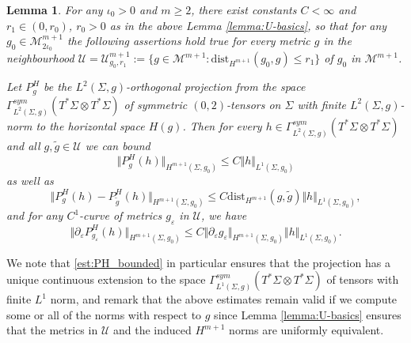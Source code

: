\documentclass[10pt,reqno]{amsart}
\theoremstyle{plain}
\newtheorem{lemma}{Lemma}[section]
\theoremstyle{definition}
\numberwithin{equation}{section}
\newcommand{\Si}{\Sigma}
\newcommand{\peps}{\partial_{\eps}}
\newcommand{\norm}[1]{\Vert#1\Vert}
\newcommand{\beq}{\begin{equation}}
\newcommand{\eeq}{\end{equation}}
\newcommand{\eps}{\varepsilon}
\newcommand{\dist}{\text{dist}}
\newcommand{\MM}{\mathcal{M}} %
\newcommand{\UU}{{\mathcal U}}
\newcommand{\MMtwoiota}{\MM_{2\iota_0}}
\begin{document}
\begin{lemma}\label{lemma:projection}
    For any $\iota_0>0$ and $m\geq 2$, there exist constants $C<\infty$ and $r_1\in (0,r_0)$, $r_0>0$ as in the above Lemma \ref{lemma:U-basics}, so that for any $g_0\in\MMtwoiota^{m+1}$ the following assertions hold true for every metric $g$ in the neighbourhood $\UU=\UU_{g_0,r_1}^{m+1}:=\{g\in  \MM^{m+1}: \dist_{H^{m+1}}(g_0,g)\leq r_1\}$ of $g_0$ in $\MM^{m+1}$.

    Let $P_g^H$ be the $L^2(\Si,g)$-orthogonal projection from the space $\Gamma^{sym}_{L^2(\Si,g)}(T^*\Si\otimes T^*\Si)$  of symmetric $(0,2)$-tensors on $\Si$ with finite $L^2(\Si,g)$-norm to the horizontal space $H(g)$. Then for every $h\in\Gamma^{sym}_{L^2(\Si,g)}(T^*\Si\otimes T^*\Si)$ and all $g,\tilde g\in \UU$  we can bound 
    \beq\label{est:PH_bounded} 
        \norm{P_g^H(h)}_{H^{m+1}(\Si,g_0)}\leq C \norm{h}_{L^1(\Si,g_0)} 
    \eeq
    as well as
    \beq\label{est:PH_Lip}
        \norm{P_{ g}^H(h)-P_{\tilde g}^H(h)}_{H^{m+1}(\Si,g_0)}\leq C \dist_{H^{m+1}}(g,\tilde g) \norm{h}_{L^1(\Si,g_0)},
    \eeq
    and for any $C^1$-curve  of metrics $g_\eps$ in $\UU$, we have
    \beq\label{est:PH_diff}
        \norm{\peps P_{g_\eps}^H(h)}_{H^{m+1}(\Si,g_0)}\le C\norm{\peps g_\eps}_{H^{m+1}(\Si,g_0)} \norm{h}_{L^1(\Si,g_0)}.
     \eeq
\end{lemma}
We note that \eqref{est:PH_bounded} in particular ensures that the projection has a unique continuous extension to the space $\Gamma^{sym}_{L^1(\Si,g)}(T^*\Si\otimes T^*\Si)$ of tensors with finite $L^1$ norm, and remark that the above estimates remain valid if we compute some or all of the norms with respect to $g$ since Lemma \ref{lemma:U-basics} ensures that the metrics in $\UU$ and the induced $H^{m+1}$ norms are uniformly equivalent.
\end{document}
